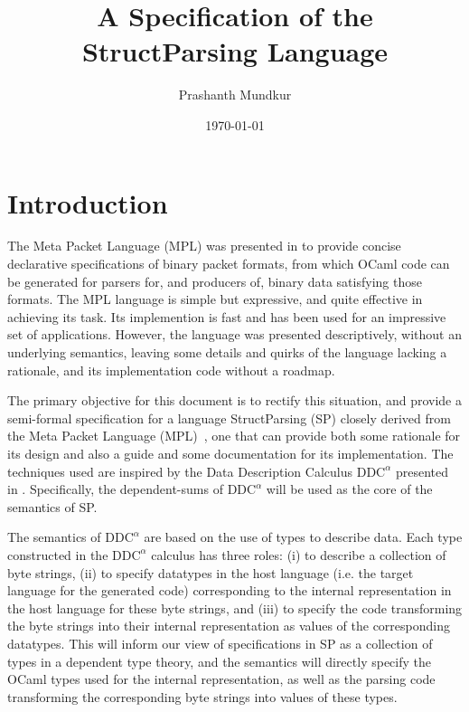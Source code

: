 \documentclass{article}
\begin{document}
\title{A Specification of the StructParsing Language}
\author{Prashanth Mundkur}
\date{\today} \maketitle

\newcommand{\DDC}{$\mathrm{DDC}^\alpha$\xspace}
\newcommand{\OCaml}{\textrm{OCaml}\xspace}

\section{Introduction}

The Meta Packet Language (MPL) was presented in
\cite{Madhavapeddy:thesis} to provide concise declarative
specifications of binary packet formats, from which \OCaml code can be
generated for parsers for, and producers of, binary data satisfying
those formats.  The MPL language is simple but expressive, and quite
effective in achieving its task.  Its implemention is fast and has
been used for an impressive set of applications.  However, the
language was presented descriptively, without an underlying semantics,
leaving some details and quirks of the language lacking a rationale,
and its implementation code without a roadmap.

The primary objective for this document is to rectify this situation,
and provide a semi-formal specification for a language StructParsing
(SP) closely derived from the Meta Packet Language
(MPL)~\cite{Madhavapeddy:thesis}, one that can provide both some
rationale for its design and also a guide and some documentation for
its implementation.  The techniques used are inspired by the Data
Description Calculus \DDC presented in \cite{Mandelbaum:thesis}.
Specifically, the dependent-sums of \DDC will be used as the core of
the semantics of SP.

The semantics of \DDC are based on the use of types to describe data.
Each type constructed in the \DDC calculus has three roles: (i) to
describe a collection of byte strings, (ii) to specify datatypes in
the host language (i.e. the target language for the generated code)
corresponding to the internal representation in the host language for
these byte strings, and (iii) to specify the code transforming the
byte strings into their internal representation as values of the
corresponding datatypes.  This will inform our view of specifications
in SP as a collection of types in a dependent type theory, and the
semantics will directly specify the \OCaml types used for the internal
representation, as well as the parsing code transforming the
corresponding byte strings into values of these types.
\end{document}
